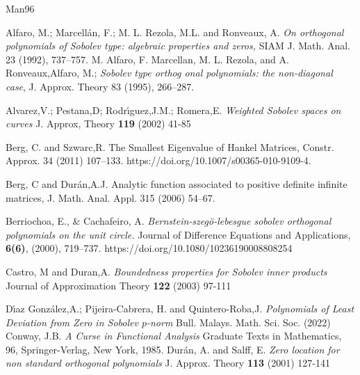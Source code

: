 \documentclass[12pt]{amsart}
\theoremstyle{definition}
\theoremstyle{plain}
\theoremstyle{remark}
\begin{document}
\begin{thebibliography}{Man96}


 Alfaro, M.; Marcell\'{a}n, F.;  M. L. Rezola, M.L. and Ronveaux, A. \emph{On orthogonal
polynomials of Sobolev type: algebraic properties and zeros,} SIAM J. Math. Anal.
23 (1992), 737–757.
 M. Alfaro, F. Marcellan, M. L. Rezola, and A. Ronveaux,Alfaro, M.; \emph{ Sobolev type orthog
onal polynomials: the non-diagonal case}, J. Approx. Theory 83 (1995), 266–287.

 Alvarez,V.; Pestana,D; Rodr\'{\i}guez,J.M.; Romera,E. \emph{Weighted Sobolev spaces on curves} J. Approx, Theory {\bf 119} (2002) 41-85



  Berg, C. and  Szwarc,R.  The Smallest Eigenvalue of Hankel Matrices, Constr. Approx. 34 (2011) 107--133. https://doi.org/10.1007/s00365-010-9109-4.

Berg, C and  Dur\'{a}n,A.J.  Analytic function associated to positive definite infinite matrices, J. Math. Anal. Appl. 315 (2006) 54--67.


 Berriochoa, E., \& Cachafeiro, A. \emph{Bernstein-szegö-lebesgue sobolev orthogonal polynomials on the unit circle.} Journal of Difference Equations and Applications, {\bf 6(6)}, (2000), 719–737. https://doi.org/10.1080/10236190008808254



 Castro, M and Duran,A. \emph{Boundedness properties for Sobolev inner products} Journal of Approximation Theory {\bf 122} (2003) 97-111

 D\'{\i}az Gonz\'{a}lez,A.; Pijeira-Cabrera, H. and Quintero-Roba,J. \emph{Polynomials of Least Deviation from Zero in Sobolev $p$-norm} Bull. Malays. Math. Sci. Soc.  (2022) 
 Conway, J.B. \emph{A Curse in Functional Analysis}
       Graduate Texts in Mathematics, 96, Springer-Verlag, New York, 1985.
 Dur\'{a}n, A. and Salff, E. \emph{Zero location for non standard orthogonal polynomials } J. Approx. Theory {\bf 113} (2001) 127-141 




\end{thebibliography}
\end{document}
